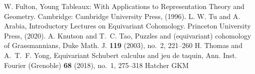 \begin{thebibliography}{99}
  
   W. Fulton, Young Tableaux: With Applications to Representation Theory and Geometry. Cambridge: Cambridge University Press, (1996).
   L. W. Tu and A. Arabia, Introductory Lectures on Equivariant Cohomology. Princeton University Press, (2020).
   A. Knutson and T.~C. Tao, Puzzles and (equivariant) cohomology of Grassmannians, Duke Math. J. {\bf 119} (2003), no.~2, 221--260 
   H. Thomas and A.~T.~F. Yong, Equivariant Schubert calculus and jeu de taquin, Ann. Inst. Fourier (Grenoble) {\bf 68} (2018), no.~1, 275--318
   Hatcher
   GKM

\end{thebibliography}
